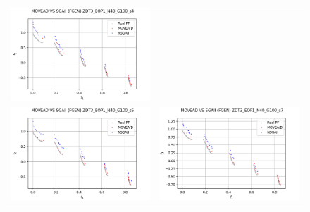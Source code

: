 \begin{figure}[H]
\begin{tabular}{c c}
    \includegraphics[scale=0.5]{figures/ZDT3_EOP1_N40_G100_T6/s4_comp.png}\\
    \includegraphics[scale=0.5]{figures/ZDT3_EOP1_N40_G100_T6/s5_comp.png} &
    \includegraphics[scale=0.5]{figures/ZDT3_EOP1_N40_G100_T6/s7_comp.png}\\

\end{tabular}
\end{figure}
